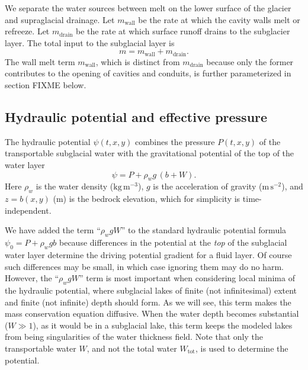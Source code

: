 \documentclass[11pt,final]{amsart}
\newcommand{\Wtot}{W_{\text{tot}}}
\begin{document}
We separate the water sources between melt on the lower surface of the glacier and supraglacial drainage.  Let $m_{\text{wall}}$ be the rate at which the cavity walls melt or refreeze.  Let $m_{\text{drain}}$ be the rate at which surface runoff drains to the subglacier layer.  The total input to the subglacial layer is
\newcommand{\mwall}{m_{\text{wall}}}
\newcommand{\mdrain}{m_{\text{drain}}}
\begin{equation}
m = \mwall + \mdrain. \label{eq:totalinput}
\end{equation}
The wall melt term $\mwall$, which is distinct from $\mdrain$ because only the former contributes to the opening of cavities and conduits, is further parameterized in section FIXME below.

\subsection*{Hydraulic potential and effective pressure}  The  hydraulic potential $\psi(t,x,y)$ combines the pressure $P(t,x,y)$ of the transportable subglacial water with the gravitational potential of the top of the water layer \citep{Goelleretal2013,Hewittetal2012}
\begin{equation} \label{eq:potential}
\psi = P + \rho_w g\, (b+W).
\end{equation}
Here $\rho_w$ is the water density ($\text{kg}\,\text{m}^{-3}$), $g$ is the acceleration of gravity ($\text{m}\,\text{s}^{-2}$), and $z=b(x,y)$ ($\text{m}$) is the bedrock elevation, which for simplicity is time-independent.

We have added the term ``$\rho_w g W$'' to the standard hydraulic potential formula $\psi_0 = P + \rho_w g b$ \citep{Clarke05,Shreve1972} because differences in the potential at the \emph{top} of the subglacial water layer determine the driving potential gradient for a fluid layer.  Of course such differences may be small, in which case ignoring them may do no harm.  However, the  ``$\rho_w g W$'' term is most important when considering local minima of the hydraulic potential, where subglacial lakes of finite (not infinitesimal) extent and finite (not infinite) depth should form.  As we will see, this term makes the mass conservation equation diffusive.  When the water depth becomes substantial ($W\gg 1$), as it would be in a subglacial lake, this term keeps the modeled lakes from being singularities of the water thickness field.  Note that only the transportable water $W$, and not the total water $\Wtot$, is used to determine the potential.
\end{document}
